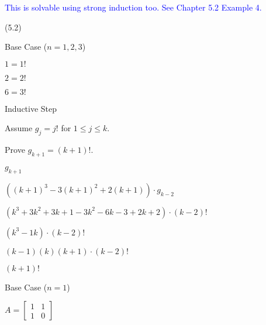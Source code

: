 \documentclass{exam}
\begin{document}
\begin{questions}
\begin{center}
\textcolor{blue}{This is solvable using strong induction too. See Chapter 5.2 Example 4.}

\end{center}

\newpage

 (5.2)

\begin{center}
Base Case (\(n = 1, 2, 3\))

\(1 = 1!\)

\(2 = 2!\)

\(6 = 3!\)
\vspace{5px}

Inductive Step

Assume \( g_j = j! \) for \(1 \leq j \leq k\).

Prove \( g_{k+1} = (k+1)! \).

\(g_{k+1}\)

\(((k+1)^3 - 3(k+1)^2 + 2(k+1)) \cdot g_{k-2} \)

\((k^3 + 3k^2 + 3k + 1 - 3k^2 - 6k - 3 + 2k + 2) \cdot (k-2)! \)

\((k^3 - 1k) \cdot (k-2)! \)

\( (k-1)(k)(k+1) \cdot (k-2)! \)

\( (k+1)! \)

\end{center}


\begin{center}
Base Case (\(n = 1\))

\( A =
\begin{bmatrix}
1 & 1\\
1 & 0
\end{bmatrix}
\)

\vspace{5px}


\end{center}
\end{questions}
\end{document}
